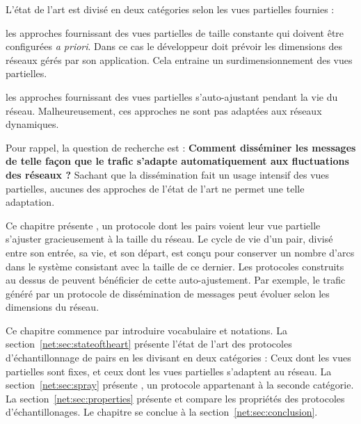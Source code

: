 L'état de l'art est divisé en deux catégories selon les vues partielles fournies :
\begin{inparaenum}
\item les approches fournissant des vues partielles de taille constante qui
  doivent être configurées \emph{a priori}. Dans ce cas le développeur doit
  prévoir les dimensions des réseaux gérés par son application. Cela entraine un
  surdimensionnement des vues partielles.
\item les approches fournissant des vues partielles s'auto-ajustant pendant la
  vie du réseau. Malheureusement, ces approches ne sont pas adaptées aux réseaux
  dynamiques.
\end{inparaenum}

Pour rappel, la question de recherche est : \textbf{Comment disséminer les
  messages de telle façon que le trafic s’adapte automatiquement aux
  fluctuations des réseaux ?}  Sachant que la dissémination fait un usage
intensif des vues partielles, aucunes des approches de l'état de l'art ne permet
une telle adaptation.

Ce chapitre présente \SPRAY, un protocole dont les pairs voient leur vue
partielle s'ajuster gracieusement à la taille du réseau. Le cycle de vie d'un
pair, divisé entre son entrée, sa vie, et son départ, est conçu pour conserver
un nombre d'arcs dans le système consistant avec la taille de ce dernier. Les
protocoles construits au dessus de \SPRAY peuvent bénéficier de cette
auto-ajustement. Par exemple, le trafic généré par un protocole de dissémination
de messages peut évoluer selon les dimensions du réseau.

Ce chapitre commence par introduire vocabulaire et notations. La
section~\ref{net:sec:stateoftheart} présente l'état de l'art des protocoles
d'échantillonnage de pairs en les divisant en deux catégories : Ceux dont les
vues partielles sont fixes, et ceux dont les vues partielles s'adaptent au
réseau. La section~\ref{net:sec:spray} présente \SPRAY, un protocole appartenant
à la seconde catégorie. La section~\ref{net:sec:properties} présente et compare
les propriétés des protocoles d'échantillonages. Le chapitre se conclue à la
section~\ref{net:sec:conclusion}.

